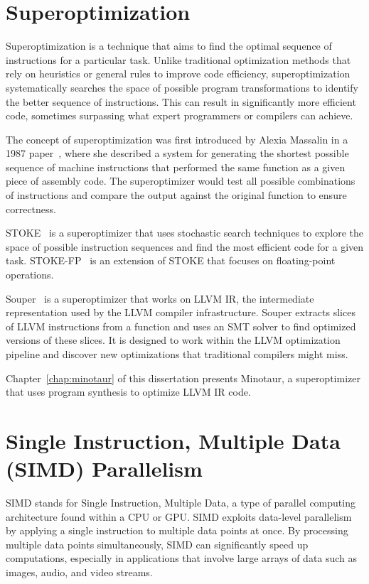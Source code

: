 \section{Superoptimization}
\label{sec:superoptimization}


Superoptimization is a technique that aims to find
the optimal sequence of instructions for a particular task.
%
Unlike traditional optimization methods that rely on heuristics or
general rules to improve code efficiency, superoptimization
systematically searches the space of possible program transformations
to identify the better sequence of instructions.
%
This can result in significantly more efficient code, sometimes
surpassing what expert programmers or compilers can achieve.

The concept of superoptimization was first introduced by Alexia
Massalin in a 1987 paper~\cite{massalin}, where she described a system for generating
the shortest possible sequence of machine instructions that performed
the same function as a given piece of assembly code. The
superoptimizer would test all possible combinations of instructions
and compare the output against the original function to ensure
correctness.

STOKE~\cite{stoke} is a superoptimizer that uses stochastic search techniques to
explore the space of possible instruction sequences and find the most
efficient code for a given task. STOKE-FP~\cite{stoke-fp} is an extension of STOKE
that focuses on floating-point operations.

Souper~\cite{souper} is a superoptimizer that works on LLVM IR, the intermediate
representation used by the LLVM compiler infrastructure. Souper
extracts slices of LLVM instructions from a function and uses an SMT
solver to find optimized versions of these slices. It is designed to
work within the LLVM optimization pipeline and discover new
optimizations that traditional compilers might miss.

Chapter~\ref{chap:minotaur} of this dissertation presents Minotaur, a superoptimizer
that uses program synthesis to optimize LLVM IR code.

\section{Single Instruction, Multiple Data (SIMD) Parallelism}
\label{sec:simd}

SIMD stands for Single Instruction, Multiple Data, a type of parallel
computing architecture found within a CPU or GPU. SIMD exploits
data-level parallelism by applying a single instruction to multiple
data points at once.
%
By processing multiple data points simultaneously, SIMD can
significantly speed up computations, especially in applications that
involve large arrays of data such as images, audio, and video streams.

